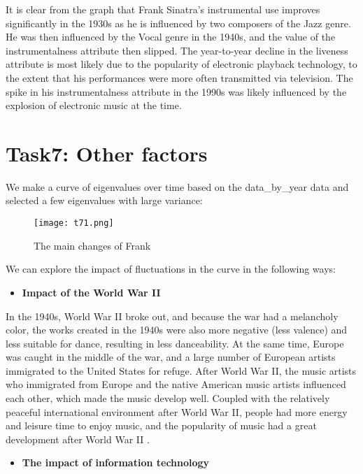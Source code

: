 \documentclass[12pt]{article}  %
\newcommand{\upcite}[1]{\textsuperscript{\textsuperscript{\cite{#1}}}}
\begin{document}
It is clear from the graph that Frank Sinatra's instrumental use improves significantly in the 1930s as he is influenced by two composers of the Jazz genre. He was then influenced by the Vocal genre in the 1940s, and the value of the instrumentalness attribute then slipped. The year-to-year decline in the liveness attribute is most likely due to the popularity of electronic playback technology, to the extent that his performances were more often transmitted via television. The spike in his instrumentalness attribute in the 1990s was likely influenced by the explosion of electronic music at the time.

\section{Task7: Other factors}
We make a curve of eigenvalues over time based on the data\_by\_year data and selected a few eigenvalues with large variance:

\begin{figure}[H]
	\centering
	\texttt{[image: t71.png]}
	\caption{The main changes of Frank}
	\label{img}
\end{figure}
We can explore the impact of fluctuations in the curve in the following ways:

\begin{itemize}
	\item \textbf{Impact of the World War II}
\end{itemize}

	In the 1940s, World War II broke out, and because the war had a melancholy color, the works created in the 1940s were also more negative (less valence) and less suitable for dance, resulting in less danceability. At the same time, Europe was caught in the middle of the war, and a large number of European artists immigrated to the United States for refuge. After World War II, the music artists who immigrated from Europe and the native American music artists influenced each other, which made the music develop well. Coupled with the relatively peaceful international environment after World War II, people had more energy and leisure time to enjoy music, and the popularity of music had a great development after World War II\upcite{3}
	.
	
\begin{itemize}
	\item \textbf{The impact of information technology}
\end{itemize}
\end{document}
